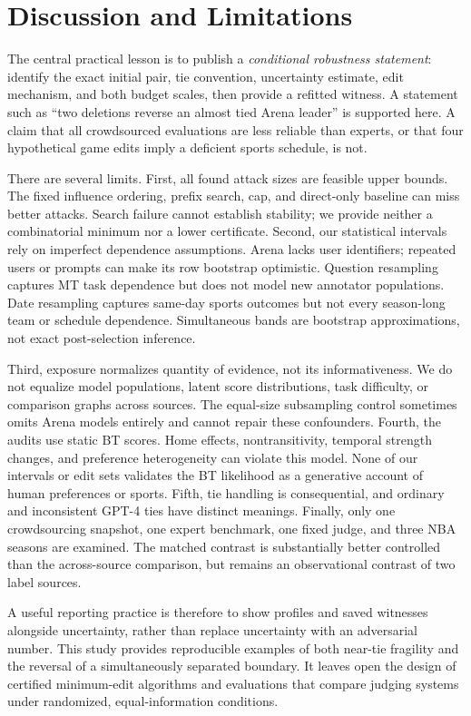 \documentclass{article}
\begin{document}
\section{Discussion and Limitations}
The central practical lesson is to publish a \emph{conditional robustness statement}: identify the exact initial pair, tie convention, uncertainty estimate, edit mechanism, and both budget scales, then provide a refitted witness. A statement such as ``two deletions reverse an almost tied Arena leader'' is supported here. A claim that all crowdsourced evaluations are less reliable than experts, or that four hypothetical game edits imply a deficient sports schedule, is not.

There are several limits. First, all found attack sizes are feasible upper bounds. The fixed influence ordering, prefix search, cap, and direct-only baseline can miss better attacks. Search failure cannot establish stability; we provide neither a combinatorial minimum nor a lower certificate. Second, our statistical intervals rely on imperfect dependence assumptions. Arena lacks user identifiers; repeated users or prompts can make its row bootstrap optimistic. Question resampling captures MT task dependence but does not model new annotator populations. Date resampling captures same-day sports outcomes but not every season-long team or schedule dependence. Simultaneous bands are bootstrap approximations, not exact post-selection inference.

Third, exposure normalizes quantity of evidence, not its informativeness. We do not equalize model populations, latent score distributions, task difficulty, or comparison graphs across sources. The equal-size subsampling control sometimes omits Arena models entirely and cannot repair these confounders. Fourth, the audits use static BT scores. Home effects, nontransitivity, temporal strength changes, and preference heterogeneity can violate this model. None of our intervals or edit sets validates the BT likelihood as a generative account of human preferences or sports. Fifth, tie handling is consequential, and ordinary and inconsistent GPT-4 ties have distinct meanings. Finally, only one crowdsourcing snapshot, one expert benchmark, one fixed judge, and three NBA seasons are examined. The matched contrast is substantially better controlled than the across-source comparison, but remains an observational contrast of two label sources.

A useful reporting practice is therefore to show profiles and saved witnesses alongside uncertainty, rather than replace uncertainty with an adversarial number. This study provides reproducible examples of both near-tie fragility and the reversal of a simultaneously separated boundary. It leaves open the design of certified minimum-edit algorithms and evaluations that compare judging systems under randomized, equal-information conditions.
\end{document}
